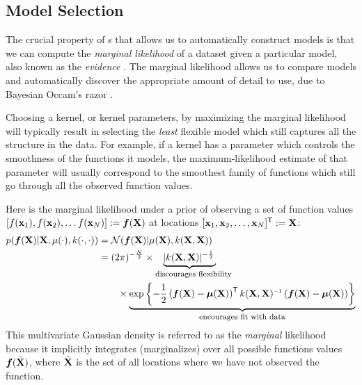 \subsection{Model Selection}

The crucial property of \gp{}s that allows us to automatically construct models is that we can compute the \emph{marginal likelihood} of a dataset given a particular model, also known as the \emph{evidence} \citep{mackay1992bayesian}.
The marginal likelihood allows us to compare models and automatically discover the appropriate amount of detail to use, due to Bayesian Occam's razor \citep{rasmussen2001occam,mackay2003information}.

Choosing a kernel, or kernel parameters, by maximizing the marginal likelihood will typically result in selecting the \emph{least} flexible model which still captures all the structure in the data.
For example, if a kernel has a parameter which controls the smoothness of the functions it models, the maximum-likelihood estimate of that parameter will usually correspond to the smoothest family of functions which still go through all the observed function values.

Here is the marginal likelihood under a \gp{} prior of observing a set of function values $\left[ f({\bf{x}}_1), f({\bf{x}}_2), \ldots f({\bf{x}}_N)  \right] \mathrel{:\mkern-0.25mu=} \boldsymbol{f}(\mathbf{X})$ at locations $[{\bf{x}}_1, {\bf{x}}_2, \ldots, {\bf{x}}_N]^{\mathsf{T}} \mathrel{:\mkern-0.25mu=} \mathbf{X}$:
%
\begin{align}
p(\funcval | \vX, \mu(\cdot), k(\cdot, \cdot)) & = \N{\funcval}{\mu(\vX)}{k(\vX, \vX)} \label{eq:gp_marg_lik} \\
& = (2\pi)^{-\frac{N}{2}} \times \underwrite{ |k(\vX, \vX)|^{-\frac{1}{2}}\,}{\parbox{2.5cm}{\parbox{3.5cm}{\footnotesize discourages flexibility}}} \nonumber \\
 & \qquad \times \underwrite{\exp \left\{ -\frac{1}{2} \left( \funcval - \boldsymbol\mu(\vX) \right)\tra k(\vX, \vX)\inv \left(\funcval - \boldsymbol\mu(\vX) \right) \right\}}{\footnotesize encourages fit with data} \nonumber
\end{align}
%
This multivariate Gaussian density is referred to as the \emph{marginal} likelihood because it implicitly integrates (marginalizes) over all possible functions values $\boldsymbol{f}( \bar {\mathbf{X}})$, where $\bar {\mathbf{X}}$ is the set of all locations where we have not observed the function.

